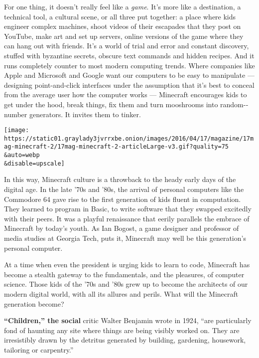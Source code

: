 For one thing, it doesn't really feel like a \emph{game}. It's more like
a destination, a technical tool, a cultural scene, or all three put
together: a place where kids engineer complex machines, shoot videos of
their escapades that they post on YouTube, make art and set up servers,
online versions of the game where they can hang out with friends. It's a
world of trial and error and constant discovery, stuffed with byzantine
secrets, obscure text commands and hidden recipes. And it runs
completely counter to most modern computing trends. Where companies like
Apple and Microsoft and Google want our computers to be easy to
manipulate --- designing point-and-click interfaces under the assumption
that it's best to conceal from the average user how the computer works
--- Minecraft encourages kids to get under the hood, break things, fix
them and turn mooshrooms into random-­number generators. It invites them
to tinker.

\texttt{[image: https://static01.graylady3jvrrxbe.onion/images/2016/04/17/magazine/17mag-minecraft-2/17mag-minecraft-2-articleLarge-v3.gif?quality=75\\\&auto=webp\\\&disable=upscale]}

In this way, Minecraft culture is a throwback to the heady early days of
the digital age. In the late '70s and '80s, the arrival of personal
computers like the Commodore 64 gave rise to the first generation of
kids fluent in computation. They learned to program in Basic, to write
software that they swapped excitedly with their peers. It was a playful
renaissance that eerily parallels the embrace of Minecraft by today's
youth. As Ian Bogost, a game designer and professor of media studies at
Georgia Tech, puts it, Minecraft may well be this generation's personal
computer.

At a time when even the president is urging kids to learn to code,
Minecraft has become a stealth gateway to the fundamentals, and the
pleasures, of computer science. Those kids of the '70s and '80s grew up
to become the architects of our modern digital world, with all its
allures and perils. What will the Minecraft generation become?

\textbf{``Children,'' the social} critic Walter Benjamin wrote in 1924,
``are particularly fond of haunting any site where things are being
visibly worked on. They are irresistibly drawn by the detritus generated
by building, gardening, housework, tailoring or carpentry.''

